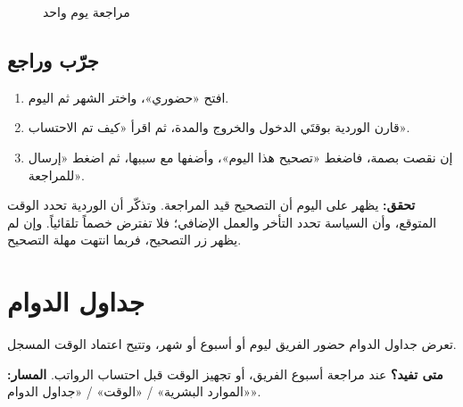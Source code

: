 \begin{figure}[H]
\centering
{}
\rclegend
\caption{مراجعة يوم واحد}
\label{fig:hr-day-review}
\end{figure}

\subsection{جرّب وراجع}

\begin{enumerate}
  \item افتح «حضوري»، واختر الشهر ثم اليوم.
  \item قارن الوردية بوقتَي الدخول والخروج والمدة، ثم اقرأ «كيف تم الاحتساب».
  \item إن نقصت بصمة، فاضغط «تصحيح هذا اليوم»، وأضفها مع سببها، ثم اضغط «إرسال للمراجعة».
\end{enumerate}

\textbf{تحقق:} يظهر على اليوم أن التصحيح قيد المراجعة. وتذكّر أن الوردية تحدد الوقت المتوقع، وأن السياسة تحدد التأخر والعمل الإضافي؛ فلا تفترض خصماً تلقائياً. وإن لم يظهر زر التصحيح، فربما انتهت مهلة التصحيح.

\clearpage
\section{جداول الدوام}
\label{sec:hr-feature-timesheets}

تعرض جداول الدوام حضور الفريق ليوم أو أسبوع أو شهر، وتتيح اعتماد الوقت المسجل.

\textbf{متى تفيد؟} عند مراجعة أسبوع الفريق، أو تجهيز الوقت قبل احتساب الرواتب. \textbf{المسار:} «الموارد البشرية» / «الوقت» / «جداول الدوام».

